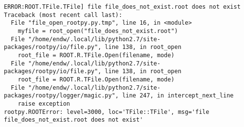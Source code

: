 \begin{footnotesize}
\begin{verbatim}
ERROR:ROOT.TFile.TFile] file file_does_not_exist.root does not exist
Traceback (most recent call last):
  File "file_open_rootpy.py.tmp", line 16, in <module>
    myfile = root_open("file_does_not_exist.root")
  File "/home/endw/.local/lib/python2.7/site-packages/rootpy/io/file.py", line 138, in root_open
    root_file = ROOT.R.TFile.Open(filename, mode)
  File "/home/endw/.local/lib/python2.7/site-packages/rootpy/io/file.py", line 138, in root_open
    root_file = ROOT.R.TFile.Open(filename, mode)
  File "/home/endw/.local/lib/python2.7/site-packages/rootpy/logger/magic.py", line 247, in intercept_next_line
    raise exception
rootpy.ROOTError: level=3000, loc='TFile::TFile', msg='file file_does_not_exist.root does not exist'
\end{verbatim}
\end{footnotesize}
